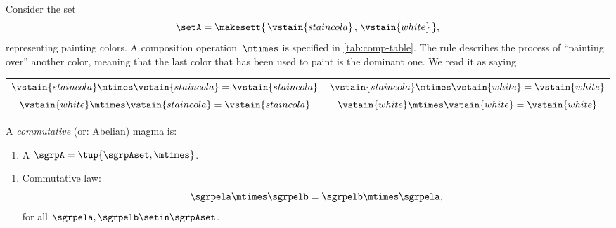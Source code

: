 \begin{example}
    Consider the set
    \begin{equation}
        \setA = \makesett{\hspace{0.05cm} \vstain{staincola}\hspace{0.05cm},\hspace{0.05cm} \vstain{white}\hspace{0.05cm}},
    \end{equation}
    representing painting colors.
    A composition operation~$\mtimes$ is specified in \cref{tab:comp-table}.
    The rule describes the process of ``painting over'' another color, meaning that the last color that has been used to paint is the dominant one.
    We read it as saying
    \begin{center}
        \setlength{\tabcolsep}{20pt}
        \begin{tabular}{cc}
            $\vstain{staincola} \mtimes \vstain{staincola} = \vstain{staincola}$ & $\vstain{staincola} \mtimes \vstain{white} = \vstain{white}$ \\
            $\vstain{white} \mtimes \vstain{staincola} = \vstain{staincola}$     & $\vstain{white} \mtimes \vstain{white} = \vstain{white}$
        \end{tabular}
    \end{center}
\end{example}

\begin{marginfigure}
    \centering
    \caption{The commutativity property}
    \label{fig:magma-diagram}
\end{marginfigure}


\begin{definition}
    \label{def:magma-commutativity}
    A \emph{commutative} (or: Abelian) magma is:

    \constit
    \begin{enumerate}
        \item A  $\sgrpA = \tup{\sgrpAset, \mtimes}$.
    \end{enumerate}

    \condit
    \begin{enumerate}
        \item Commutative law:
              \begin{equation}
                  \label{eq:semigroup-commutativity}
                  \sgrpela \mtimes \sgrpelb = \sgrpelb \mtimes \sgrpela,
              \end{equation}
              for all $\sgrpela, \sgrpelb \setin \sgrpAset$.
    \end{enumerate}
\end{definition}

